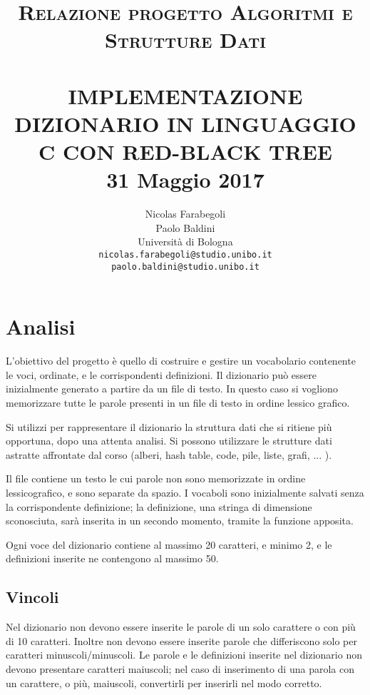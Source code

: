 \documentclass[paper=a4, fontsize=11pt,twoside]{scrartcl}   %
\title{ \normalsize \textsc{Relazione progetto Algoritmi e Strutture Dati}    %
	\\[2.0cm]                               %
	\HRule{0.5pt} \\                        %
	\LARGE \textbf{\uppercase{Implementazione dizionario in linguaggio 
			C con Red-Black Tree}}    %
	\HRule{2pt} \\ [0.5cm]      %
	\normalsize 31 Maggio 2017          %
}
\author{
	Nicolas Farabegoli\\
	Paolo Baldini\\
	Università di Bologna\\  
	\texttt{nicolas.farabegoli@studio.unibo.it} \\
	\texttt{paolo.baldini@studio.unibo.it}\\
}
\makeatletter
\def\printtitle{%
	{\centering \@title\par}}
\def\printauthor{%
	{\centering \large \@author}}
\makeatother
\begin{document}
	\thispagestyle{empty}       %
	
	\printtitle                 %
	\vfill
	\printauthor                %
	\newpage
	\tableofcontents
	\newpage
	\setcounter{page}{1}        %
	
	\section{Analisi}
		L'obiettivo del progetto è quello di costruire e gestire un vocabolario 
		contenente le voci, ordinate, e le corrispondenti definizioni. 
		Il dizionario può essere inizialmente generato a partire da un file di testo.  
		In questo caso si vogliono memorizzare tutte le parole presenti in un file di 
		testo in ordine lessico grafico.
		
		Si utilizzi per rappresentare il dizionario la struttura dati che si ritiene 
		più opportuna, dopo una attenta analisi. Si possono utilizzare le strutture 
		dati astratte affrontate dal corso (alberi, hash table, code, pile, liste, 
		grafi, ... ).
		
		Il file contiene un testo le cui parole non sono memorizzate in ordine lessicografico, e sono separate da spazio. I vocaboli sono inizialmente salvati senza la corrispondente definizione; la definizione, una stringa di dimensione sconosciuta, sarà inserita in un secondo momento, tramite la funzione apposita.
		
		Ogni voce del dizionario contiene al massimo 20 caratteri, e minimo 2, e le definizioni inserite ne contengono al massimo 50.
		
			\subsection{Vincoli}
				Nel dizionario non devono essere inserite le parole di un solo carattere o con più di 10 caratteri. Inoltre non devono essere inserite parole che differiscono solo per caratteri minuscoli/minuscoli. Le parole e le definizioni inserite nel dizionario non devono presentare caratteri maiuscoli; nel caso di inserimento di una parola con un carattere, o più, maiuscoli, convertirli per inserirli nel modo corretto. 
				
\end{document}

